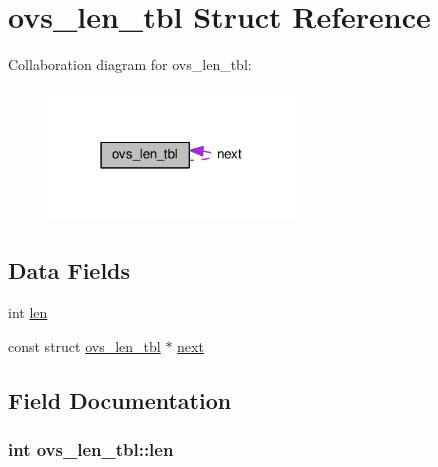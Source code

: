 \hypertarget{structovs__len__tbl}{}\section{ovs\+\_\+len\+\_\+tbl Struct Reference}
\label{structovs__len__tbl}


Collaboration diagram for ovs\+\_\+len\+\_\+tbl\+:
\nopagebreak
\begin{figure}[H]
\begin{center}
\leavevmode
\includegraphics[width=186pt]{structovs__len__tbl__coll__graph}
\end{center}
\end{figure}
\subsection*{Data Fields}
\begin{DoxyCompactItemize}
\item 
int \hyperlink{structovs__len__tbl_a70f2cb0cf35baf6a1941942a8b70318c}{len}
\item 
const struct \hyperlink{structovs__len__tbl}{ovs\+\_\+len\+\_\+tbl} $\ast$ \hyperlink{structovs__len__tbl_a0def32b4bc5790a24631d4d7727954af}{next}
\end{DoxyCompactItemize}


\subsection{Field Documentation}
\hypertarget{structovs__len__tbl_a70f2cb0cf35baf6a1941942a8b70318c}{}
\subsubsection[{len}]{\setlength{\rightskip}{0pt plus 5cm}int ovs\+\_\+len\+\_\+tbl\+::len}\label{structovs__len__tbl_a70f2cb0cf35baf6a1941942a8b70318c}
\hypertarget{structovs__len__tbl_a0def32b4bc5790a24631d4d7727954af}{}
